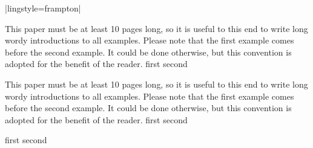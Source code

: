 \bye



\bullsec |lingstyle=frampton|


\pex[exno=65,preambleanchor=text,preambleoffset=0pt]
This paper must be at least 10 pages long,
so it is useful to this end to write long wordy introductions to
all examples.  Please note that the first example comes before
the second example.  It could be done otherwise, but this
convention is adopted for the benefit of the reader.
\a first
\a second
\xe

\pex[exno=65,preambleanchor=labelleft,preambleoffset=0pt]
This paper must be at least 10 pages long,
so it is useful to this end to write long wordy introductions to
all examples.  Please note that the first example comes before
the second example.  It could be done otherwise, but this
convention is adopted for the benefit of the reader.
\a first
\a second
\xe

\pex[exno=65,preambleanchor=labelleft,preambleoffset=0pt]
\a first
\a second
\xe

\bye


